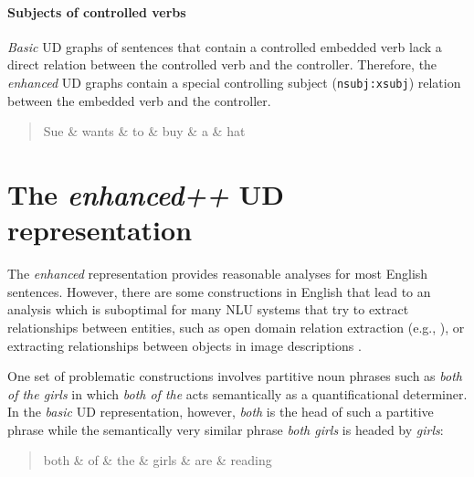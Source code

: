 \documentclass[10pt, a4paper]{article}
\begin{document}
\paragraph{Subjects of controlled verbs} \textit{Basic} UD graphs of sentences that contain a controlled embedded verb lack a direct relation between
the controlled verb and the controller. Therefore, the \textit{enhanced} UD graphs contain a special controlling subject (\texttt{nsubj:xsubj}) 
relation between the embedded verb and the controller.

\begin{quote}
\begin{center}
\begin{dependency}[column sep=0.2em, edge unit distance=2.25ex]
  \begin{deptext}
    Sue \& wants \& to \& buy \& a \& hat \\
  \end{deptext}
\end{dependency}
\end{center}
\end{quote}



\section{The \textit{enhanced++} UD representation }

The \textit{enhanced} representation provides reasonable analyses for most English sentences. However, there are some
constructions in English that lead to an analysis which is suboptimal for many NLU systems
 that try to extract relationships between entities, such as open domain relation extraction 
(e.g., ), or extracting relationships between objects in 
image descriptions \cite{schuster2015generating}.

One set of problematic constructions involves partitive noun phrases 
such as \textit{both of the girls} in which \textit{both of the} acts semantically 
as a quantificational determiner. In the \textit{basic} UD representation, however, 
\textit{both} is the head of such a partitive phrase while the semantically 
very similar phrase \textit{both girls} is headed by \textit{girls}:

\begin{quote}
\begin{center}
\begin{dependency}[column sep=0.2em, edge unit distance=2.25ex]
  \begin{deptext}
   both \& of \&  the \& girls \& are \& reading \\
  \end{deptext}

\end{dependency}
\end{center}
\end{quote}
\end{document}

